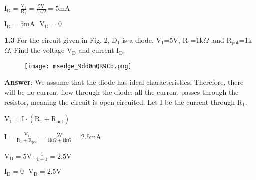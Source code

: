 \documentclass{article}
\begin{document}
{I$\displaystyle_\text{D} = \frac{\text{V}_\text{1}}{\text{R}_1} = \frac{5\text{V}}{1\text{k}\Omega} = 5$mA}

\vspace{4mm}

{$\boxed{\text{I}_\text{D} = 5\text{mA} \ \ \ \text{V}_\text{D} = 0 }$}

\vspace{8mm}

\newpage

{\textbf{1.3} For the circuit given in Fig. 2, D$_1$ is a diode, V$_1$=5V, R$_1$=1k$\Omega$ ,and R$_{\text{pot}}$=1k$\Omega$. Find the voltage V$_{\text{D}}$ and current I$_{\text{D}}$.}

\begin{figure}[H]
    \centering
    \texttt{[image: msedge\_9dd0mQR9Cb.png]}
\end{figure}

\vspace{4mm}

{\textbf{Answer}: We assume that the diode has ideal characteristics. Therefore, there will be no current flow through the diode; all the current passes through the resistor, meaning the circuit is open-circuited. Let I be the current through R$_1$.}

\vspace{4mm}

{V$_1 = \text{I} \cdot (\text{R}_1 + \text{R}_\text{pot})$}

\vspace{4mm}

{$\text{I}\displaystyle = \frac{\text{V}_\text{1}}{\text{R}_1 + \text{R}_\text{pot}} = \frac{5\text{V}}{1\text{k}\Omega + 1\text{k}\Omega} = 2.5$mA}

\vspace{4mm}

{V$\displaystyle_\text{D} = 5\text{V}\cdot\frac{1}{1+1} = 2.5$V}

\vspace{4mm}

{$\boxed{\text{I}_\text{D} = 0 \ \ \ \text{V}_\text{D} = 2.5\text{V}}$}
\end{document}
